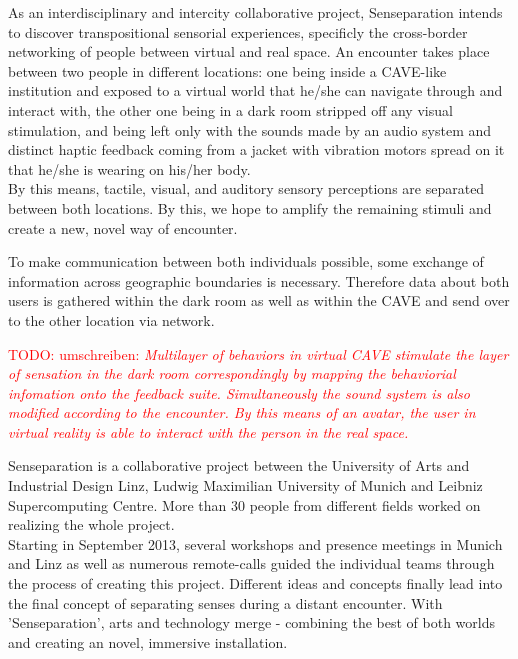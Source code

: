 \documentclass[conference]{acmsiggraph}
\newcommand{\todo}[1]{\textcolor{red}{TODO: #1}}
\begin{document}
As an interdisciplinary and intercity collaborative project, Senseparation intends to discover transpositional sensorial experiences, specificly the cross-border networking of people between virtual and real space.
An encounter takes place between two people in different locations: one being inside a CAVE-like institution and exposed to a virtual world that he/she can navigate through and interact with, the other one being in a dark room stripped off any visual stimulation, and being left only with the sounds made by an audio system and distinct haptic feedback coming from a jacket with vibration motors spread on it that he/she is wearing on his/her body.\\
By this means, tactile, visual, and auditory sensory perceptions are separated between both locations. By this, we hope to amplify the remaining stimuli and create a new, novel way of encounter.

To make communication between both individuals possible, some exchange of information across geographic boundaries is necessary. Therefore data about both users is gathered within the dark room as well as within the CAVE and send over to the other location via network.


\todo{umschreiben: \textit{Multilayer of behaviors in virtual CAVE stimulate the layer of sensation in the dark room correspondingly by mapping the behaviorial infomation onto the feedback suite. Simultaneously the sound system is also modified according to the encounter. By this means of an avatar, the user in virtual reality is able to interact with the person in the real space.}}

Senseparation is a collaborative project between the University of Arts and Industrial Design Linz, Ludwig Maximilian University of Munich and Leibniz Supercomputing Centre. More than 30 people from different fields worked on realizing the whole project.\\
Starting in September 2013, several workshops and presence meetings in Munich and Linz as well as numerous remote-calls guided the individual teams through the process of creating this project.
Different ideas and concepts finally lead into the final concept of separating senses during a distant encounter. With 'Senseparation', arts and technology merge - combining the best of both worlds and creating an novel, immersive installation.
\end{document}
